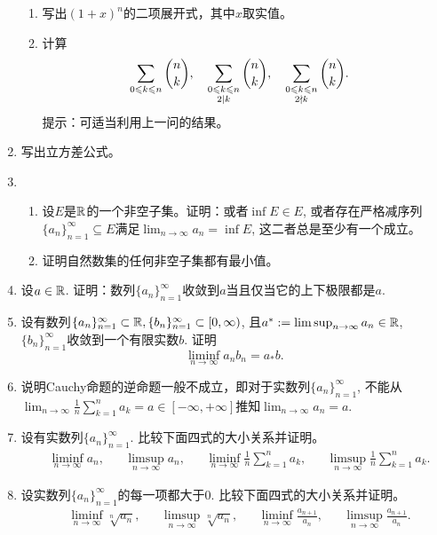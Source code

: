 \begin{enumerate}
\begin{enumerate}
        \item 写出$(1+x)^n$的二项展开式，其中$x$取实值。
        \item 计算\begin{align*}
                &\sum_{0\leqslant k\leqslant n} \binom{n}{k},&&\sum_{\begin{subarray}{c} 0\leqslant k\leqslant n\\2\mid k\end{subarray}} \binom{n}{k},&&\sum_{\begin{subarray}{c}0\leqslant k\leqslant n\\2\nmid k\end{subarray}} \binom{n}{k}.
            \end{align*}提示：可适当利用上一问的结果。
    \end{enumerate}
    \item 写出立方差公式。
    \item \begin{enumerate}
        \item 设$E$是$\mathbb{R}$的一个非空子集。证明：或者$\inf E\in E$, 或者存在严格减序列$\{a_n\}_{n=1}^\infty\subseteq E$满足$\lim_{n\to\infty}a_n=\inf E$, 这二者总是至少有一个成立。
        \item 证明自然数集的任何非空子集都有最小值。
    \end{enumerate}
    \item 设$a\in \mathbb{R}$. 证明：数列$\{a_n\}_{n=1}^\infty$收敛到$a$当且仅当它的上下极限都是$a$.
    \item 设有数列$\{a_n\}_{n=1}^\infty\subset \mathbb{R},\{b_n\}_{n=1}^\infty\subset [0,\infty)$, 且$a^*:=\limsup_{n\to \infty}a_n\in \mathbb{R}$, $\{b_n\}_{n=1}^\infty$收敛到一个有限实数$b$. 证明\begin{equation*}
        \liminf_{n\to\infty} a_nb_n=a_*b.
    \end{equation*}
    \item 说明Cauchy命题的逆命题一般不成立，即对于实数列$\{a_n\}_{n=1}^\infty$, 不能从$\lim_{n\to\infty}\frac{1}{n}\sum_{k=1}^{n}a_k=a\in [-\infty,+\infty]$推知$\lim_{n\to\infty}a_n=a$.
    \item 设有实数列$\{a_n\}_{n=1}^\infty$. 比较下面四式的大小关系并证明。\begin{align*}
        &\liminf_{n\to\infty}a_n,
        &&\limsup_{n\to\infty}a_n,
        &&\liminf_{n\to\infty}\frac{1}{n}\sum_{k=1}^{n}a_k,
        &&\limsup_{n\to\infty}\frac{1}{n}\sum_{k=1}^{n}a_k.
    \end{align*}
    \item 设实数列$\{a_n\}_{n=1}^{\infty}$的每一项都大于0. 比较下面四式的大小关系并证明。\begin{align*}
        &\liminf_{n\to\infty}\sqrt[n]{a_n},&&\limsup_{n\to\infty}\sqrt[n]{a_n},&&\liminf_{n\to\infty}\frac{a_{n+1}}{a_n},&&\limsup_{n\to\infty}\frac{a_{n+1}}{a_n}.
    \end{align*}
\end{enumerate}